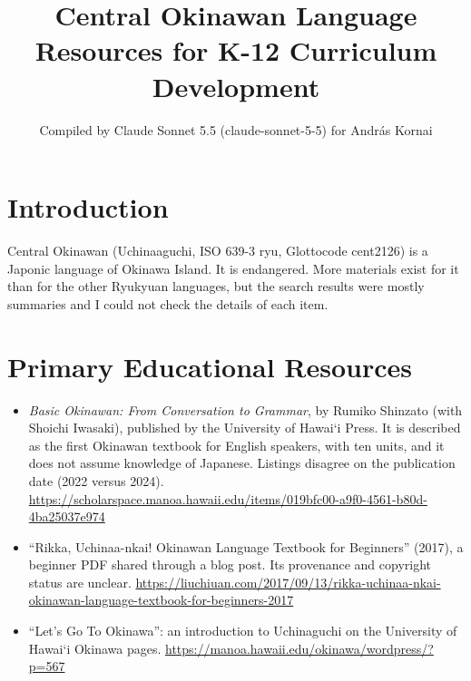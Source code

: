 \documentclass[12pt]{article}
\title{Central Okinawan Language Resources for K-12 Curriculum Development}
\author{Compiled by Claude Sonnet 5.5 (claude-sonnet-5-5) for Andr\'as Kornai}
\date{}
\begin{document}
\maketitle

\section{Introduction}
Central Okinawan (Uchinaaguchi, ISO 639-3 ryu, Glottocode cent2126) is a Japonic language of Okinawa Island. It is endangered. More materials exist for it than for the other Ryukyuan languages, but the search results were mostly summaries and I could not check the details of each item.

\section{Primary Educational Resources}
\begin{itemize}
\item \emph{Basic Okinawan: From Conversation to Grammar}, by Rumiko Shinzato (with Shoichi Iwasaki), published by the University of Hawai\textquoteleft i Press. It is described as the first Okinawan textbook for English speakers, with ten units, and it does not assume knowledge of Japanese. Listings disagree on the publication date (2022 versus 2024). \url{https://scholarspace.manoa.hawaii.edu/items/019bfc00-a9f0-4561-b80d-4ba25037e974}
\item ``Rikka, Uchinaa-nkai! Okinawan Language Textbook for Beginners'' (2017), a beginner PDF shared through a blog post. Its provenance and copyright status are unclear. \url{https://liuchiuan.com/2017/09/13/rikka-uchinaa-nkai-okinawan-language-textbook-for-beginners-2017}
\item ``Let's Go To Okinawa'': an introduction to Uchinaguchi on the University of Hawai\textquoteleft i Okinawa pages. \url{https://manoa.hawaii.edu/okinawa/wordpress/?p=567}
\end{itemize}
\end{document}
